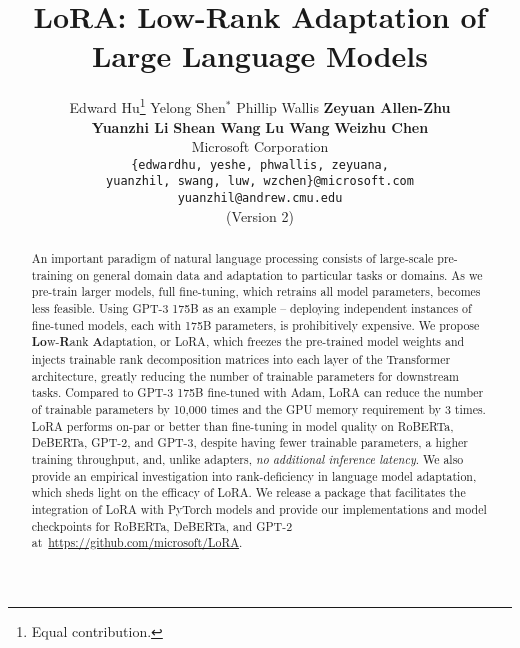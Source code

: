 \def\equationautorefname{Equation}
\def\sectionautorefname{Section}
\def\subsectionautorefname{Section}
\def\figureautorefname{Figure}
\def\wrapfigureautorefname{Figure}
\def\appendixautorefname{Appendix}



\title{LoRA: Low-Rank Adaptation of Large Language Models}


\author{%
  Edward Hu\thanks{Equal contribution.} 
  \qquad Yelong Shen$^*$ 
  \qquad Phillip Wallis
  \qquad \textbf{Zeyuan Allen-Zhu} \\
  \textbf{Yuanzhi Li}
  \qquad \textbf{Shean Wang}
  \qquad \textbf{Lu Wang}
  \qquad \textbf{Weizhu Chen}\\
  Microsoft Corporation \\
  \texttt{\{edwardhu, yeshe, phwallis, zeyuana,} \\
  \texttt{yuanzhil, swang, luw, wzchen\}@microsoft.com} \\
  \texttt{yuanzhil@andrew.cmu.edu} \\
  (Version 2)}

\iclrfinalcopy


\maketitle

\begin{abstract}
An important paradigm of natural language processing consists of large-scale pre-training on general domain data and adaptation to particular tasks or domains.
As we pre-train larger models, full fine-tuning, which retrains all model parameters, becomes less feasible.
Using GPT-3 175B as an example -- deploying independent instances of fine-tuned models, each with 175B parameters, is prohibitively expensive.
We propose \textbf{Lo}w-\textbf{R}ank \textbf{A}daptation, or LoRA, which freezes the pre-trained model weights and injects trainable rank decomposition matrices into each layer of the Transformer architecture, greatly reducing the number of trainable parameters for downstream tasks. 
Compared to GPT-3 175B fine-tuned with Adam, LoRA can reduce the number of trainable parameters by 10,000 times and the GPU memory requirement by 3 times.
LoRA performs on-par or better than fine-tuning in model quality on RoBERTa, DeBERTa, GPT-2, and GPT-3, despite having fewer trainable parameters, a higher training throughput, and, unlike adapters, \textit{no additional inference latency}.
We also provide an empirical investigation into rank-deficiency in language model adaptation, which sheds light on the efficacy of LoRA.
We release a package that facilitates the integration of LoRA with PyTorch models and provide our implementations and model checkpoints for RoBERTa, DeBERTa, and GPT-2 at~\url{https://github.com/microsoft/LoRA}.
\end{abstract}

